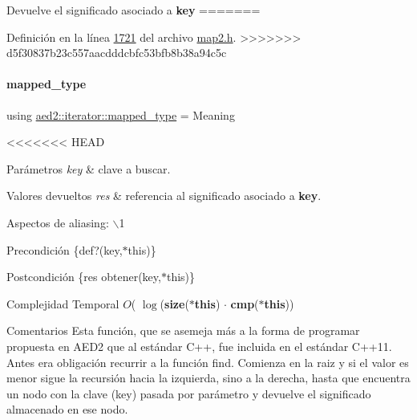 \-Devuelve el significado asociado a {\bfseries key} 
=======


Definición en la línea \hyperlink{map2_8h_source_l01721}{1721} del archivo \hyperlink{map2_8h_source}{map2.\+h}.
>>>>>>> d5f30837b23c557aacdddcbfc53bfb8b38a94c5c

\mbox{\label{classaed2_1_1iterator_a9616435dd0f809fcd47b1c23264c217e_a9616435dd0f809fcd47b1c23264c217e}} 
\paragraph{\texorpdfstring{mapped\+\_\+type}{mapped\_type}}
{\footnotesize\ttfamily using \hyperlink{classaed2_1_1iterator_a9616435dd0f809fcd47b1c23264c217e_a9616435dd0f809fcd47b1c23264c217e}{aed2\+::iterator\+::mapped\+\_\+type} =  Meaning}

<<<<<<< HEAD
\begin{DoxyParams}{\-Parámetros}
{\em key} & clave a buscar. \\
\hline
\end{DoxyParams}

\begin{DoxyRetVals}{\-Valores devueltos}
{\em res} & referencia al significado asociado a {\bfseries key}.\\
\hline
\end{DoxyRetVals}
\begin{DoxyParagraph}{\-Aspectos de aliasing\-:}
$\backslash$1
\end{DoxyParagraph}
\begin{DoxyPrecond}{\-Precondición}
\{def?(key,$\ast$this)\}
\end{DoxyPrecond}
\begin{DoxyPostcond}{\-Postcondición}
\{res  obtener(key,$\ast$this)\}
\end{DoxyPostcond}

\begin{DoxyDescription}
\item[\-Complejidad \-Temporal]$O$( $\log$({\bfseries size}({\bfseries $\ast$this}) $\cdot$ {\bfseries cmp}({\bfseries $\ast$this}))
\end{DoxyDescription}

\begin{DoxyRemark}{\-Comentarios}
\-Esta función, que se asemeja más a la forma de programar propuesta en \-A\-E\-D2 que al estándar \-C++, fue incluida en el estándar \-C++11. \-Antes era obligación recurrir a la función find. \-Comienza en la raiz y si el valor es menor sigue la recursión hacia la izquierda, sino a la derecha, hasta que encuentra un nodo con la clave (key) pasada por parámetro y devuelve el significado almacenado en ese nodo. 
\end{DoxyRemark}



